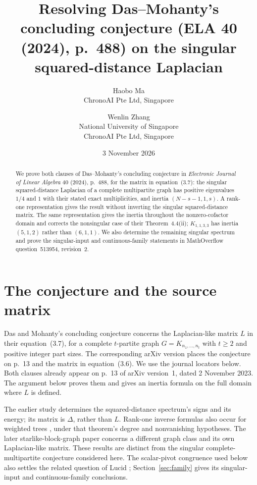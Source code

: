 \documentclass[11pt]{article}
\title{Resolving Das--Mohanty's concluding conjecture\newline
(ELA 40 (2024), p.~488)\newline
on the singular squared-distance Laplacian}
\author{Haobo Ma\\\small ChronoAI Pte Ltd, Singapore
\and Wenlin Zhang\\\small National University of Singapore\\\small ChronoAI Pte Ltd, Singapore}
\date{3 November 2026}
\begin{document}
\maketitle
\begin{abstract}
We prove both clauses of Das--Mohanty's concluding conjecture in
\emph{Electronic Journal of Linear Algebra} 40 (2024), p.~488,
for the matrix in equation~(3.7):
the singular squared-distance Laplacian of a complete multipartite graph has
positive eigenvalues $1/4$ and $1$ with their stated exact multiplicities,
and inertia $(N-s-1,1,s)$.
A rank-one representation gives the result without inverting the singular
squared-distance matrix. The same representation gives the inertia throughout
the nonzero-cofactor domain and corrects the nonsingular case of their
Theorem~4.4(ii); $K_{1,1,3,3}$ has inertia $(5,1,2)$ rather than $(6,1,1)$.
We also determine the remaining singular spectrum and prove the
singular-input and continuous-family statements in MathOverflow
question~513954, revision~2.
\end{abstract}

\section{The conjecture and the source matrix}
Das and Mohanty's concluding conjecture \cite[p.~488]{DM24} concerns
the Laplacian-like matrix $L$ in their equation~(3.7), for a complete
$t$-partite graph $G=K_{n_1,\ldots,n_t}$ with $t\geq2$ and positive integer
part sizes. The corresponding arXiv version \cite{DMpre} places the conjecture
on p.~13 and the matrix in equation~(3.6). We use the journal locators below.
Both clauses already appear on p.~13 of arXiv version~1, dated
2 November 2023. The argument below proves them and gives an inertia
formula on the full domain where $L$ is defined.

The earlier study \cite{DMspectral} determines the squared-distance
spectrum's signs and its energy; its matrix is $\Delta$, rather than $L$.
Rank-one inverse formulas also occur for weighted trees
\cite[Theorem~4.1]{Bapat19}, under that theorem's degree and nonvanishing
hypotheses. The later starlike-block-graph paper \cite{DMstar} concerns a
different graph class and its own Laplacian-like matrix. These results are
distinct from the singular complete-multipartite conjecture considered here.
The scalar-pivot congruence used below also settles the related question
of Lucid \cite{Lucid}; Section~\ref{sec:family} gives its singular-input
and continuous-family conclusions.
\end{document}
